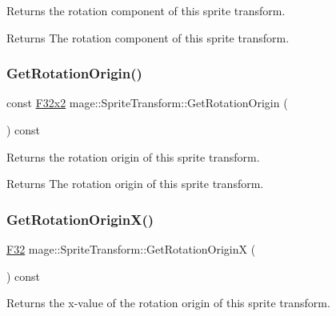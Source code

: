 Returns the rotation component of this sprite transform.

\begin{DoxyReturn}{Returns}
The rotation component of this sprite transform. 
\end{DoxyReturn}
\hypertarget{classmage_1_1_sprite_transform_a5c538636df465016643a370a9f820865}{}\label{classmage_1_1_sprite_transform_a5c538636df465016643a370a9f820865} 
\subsubsection{\texorpdfstring{Get\+Rotation\+Origin()}{GetRotationOrigin()}}
{\footnotesize\ttfamily const \hyperlink{namespacemage_aa87237ad091f5cd7da612b8523fc108f}{F32x2} mage\+::\+Sprite\+Transform\+::\+Get\+Rotation\+Origin (\begin{DoxyParamCaption}{ }\end{DoxyParamCaption}) const\hspace{0.3cm}{\ttfamily [noexcept]}}

Returns the rotation origin of this sprite transform.

\begin{DoxyReturn}{Returns}
The rotation origin of this sprite transform. 
\end{DoxyReturn}
\hypertarget{classmage_1_1_sprite_transform_a980beb77dc4b64a2d784361d61981f9c}{}\label{classmage_1_1_sprite_transform_a980beb77dc4b64a2d784361d61981f9c} 
\subsubsection{\texorpdfstring{Get\+Rotation\+Origin\+X()}{GetRotationOriginX()}}
{\footnotesize\ttfamily \hyperlink{namespacemage_aa97e833b45f06d60a0a9c4fc22ae02c0}{F32} mage\+::\+Sprite\+Transform\+::\+Get\+Rotation\+OriginX (\begin{DoxyParamCaption}{ }\end{DoxyParamCaption}) const\hspace{0.3cm}{\ttfamily [noexcept]}}

Returns the x-\/value of the rotation origin of this sprite transform.

